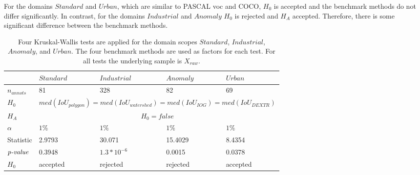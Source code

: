 For the domains $ Standard $ and $ Urban $, which are similar to PASCAL \gls{voc} and COCO, $ H_{0} $ is accepted and the benchmark methods do not differ significantly.
In contrast, for the domains $ Industrial $ and $ Anomaly $ $ H_{0} $ is rejected and $ H_{A} $ accepted. Therefore, there is some significant difference between the benchmark methods.
\begin{table}[h!]
	\centering
	\begin{tabular}{l|p{25mm} p{25mm} p{25mm} p{25mm}}
		\toprule 		
							& \centering $ Standard $	& $ Industrial $  & $ Anomaly $ & $ Urban $ \\
		\midrule
		$n_{annots}$		& 81			& 328 			  & 82			& 69 		\\
		$H_{0}$				& \multicolumn{4}{c}{$med \left( IoU_{polygon} \right) = med \left( IoU_{watershed} \right) = med \left( IoU_{IOG} \right) = med \left( IoU_{DEXTR} \right)$}  \\  
		$H_{A}$		 		&  \multicolumn{4}{c}{$H_{0} = false$}  \\ 	
		$\alpha$		 	& $1\%$ 		& $1\%$ 		  & $1\%$ 		& $1\%$ 	\\ 	
		Statistic		 	& 2.9793		& 30.071	      & 15.4029		& 8.4354   	\\ 
		$\textnormal{\textit{p-value}}$
							& 0.3948		& $1.3 * 10^{-6}$ & 0.0015		& 0.0378	\\
		$H_{0}$		  		& accepted 		& rejected		  & rejected 	& accepted  \\ 										
		\bottomrule
	\end{tabular}
	\caption[Kruskal-Wallis tests over domains]{
		Four Kruskal-Wallis tests are applied for the domain scopes $ Standard $, $ Industrial $, $ Anomaly $, and $ Urban $.
		The four benchmark methods are used as factors for each test.
		For all tests the underlying sample is $X_{raw}$.
	}\label{tab:ch5:tests_on_domains}
\end{table}

